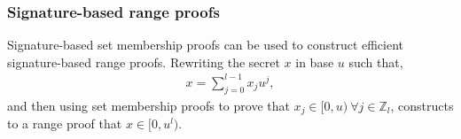 \subsubsection*{Signature-based range proofs}
Signature-based set membership proofs can be used to construct efficient signature-based range proofs. Rewriting the secret $x$ in base $u$ such that,
\begin{align*}
    x = \sum_{j=0}^{l-1} x_ju^j,
\end{align*}
and then using set membership proofs to prove that $x_j\in[0,u)\: \forall j\in\mathds{Z}_l$, constructs to a range proof that $x\in[0,u^l)$. %
